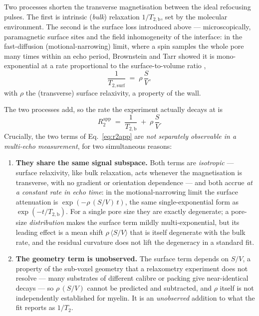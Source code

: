 Two processes shorten the transverse magnetisation between the ideal refocusing pulses.
The first is intrinsic (\emph{bulk}) relaxation $1/T_{2,\mathrm{b}}$, set by the
molecular environment. The second is the surface loss introduced above ---
microscopically, paramagnetic surface sites and the field inhomogeneity of the interface:
in the fast-diffusion (motional-narrowing) limit, where a spin samples the whole pore
many times within an echo period, Brownstein and Tarr showed it is mono-exponential at a
rate proportional to the surface-to-volume ratio \citep{Brownstein1979},
\begin{equation}
  \frac{1}{T_{2,\mathrm{surf}}} \;=\; \rho\,\frac{S}{V},
  \label{eq:bt_rate}
\end{equation}
with $\rho$ the (transverse) surface relaxivity, a property of the wall.

The two processes add, so the rate the experiment actually decays at is
\begin{equation}
  R_2^{\mathrm{app}} \;=\; \frac{1}{T_{2,\mathrm{b}}} \;+\; \rho\,\frac{S}{V}.
  \label{eq:r2app}
\end{equation}
Crucially, the two terms of Eq.~\eqref{eq:r2app} are \emph{not separately observable in
a multi-echo measurement}, for two simultaneous reasons:

\begin{enumerate}
  \item \textbf{They share the same signal subspace.} Both terms are
  \emph{isotropic} --- surface relaxivity, like bulk relaxation, acts whenever the
  magnetisation is transverse, with no gradient or orientation dependence --- and both
  accrue \emph{at a constant rate in echo time}: in the motional-narrowing limit the
  surface attenuation is $\exp(-\rho\,(S/V)\,t)$, the same single-exponential form as
  $\exp(-t/T_{2,\mathrm{b}})$. For a single pore size they are exactly degenerate; a
  pore-size \emph{distribution} makes the surface term mildly multi-exponential, but its
  leading effect is a mean shift $\rho\,\langle S/V\rangle$ that is itself degenerate
  with the bulk rate, and the residual curvature does not lift the degeneracy in a
  standard fit.

  \item \textbf{The geometry term is unobserved.} The surface term depends on $S/V$, a
  property of the sub-voxel geometry that a relaxometry experiment does not resolve ---
  many substrates of different calibre or packing give near-identical decays --- so
  $\rho\,(S/V)$ cannot be predicted and subtracted, and $\rho$ itself is not
  independently established for myelin. It is an \emph{unobserved} addition to what the
  fit reports as $1/T_2$.
\end{enumerate}

